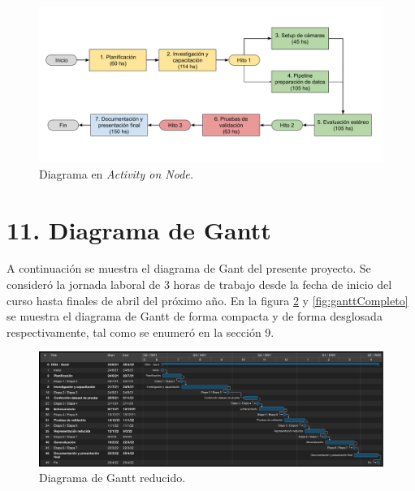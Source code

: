 \documentclass[
11pt, %
]{charter}
\begin{document}
\begin{figure}[htpb]
\centering 
\includegraphics[width=\textwidth]{./Figuras/aon.png}
\caption{Diagrama en \textit{Activity on Node.}}
\label{fig:aon}
\end{figure}

\section{11. Diagrama de Gantt}
\label{sec:gantt}

A continuación se muestra el diagrama de Gant del presente proyecto. Se consideró la jornada laboral de 3 horas de trabajo desde la fecha de inicio del curso hasta finales de abril del próximo año.
En la figura \ref{fig:ganttReducido} y \ref{fig:ganttCompleto} se muestra el diagrama de Gantt de forma compacta y de forma desglosada respectivamente, tal como se enumeró en la sección 9.

\begin{figure}[htpb]
\centering 
\includegraphics[width=\textwidth]{./Figuras/ganttReducido.pdf}
\caption{Diagrama de Gantt reducido.}
\label{fig:ganttReducido}
\end{figure}
\end{document}
